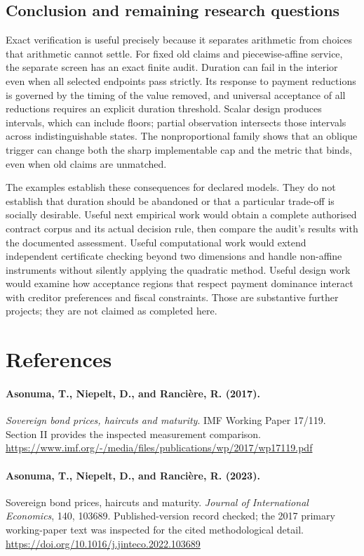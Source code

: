 \documentclass[11pt,a4paper]{article}
\begin{document}
\subsection{Conclusion and remaining research questions}
Exact verification is useful precisely because it separates arithmetic from choices that arithmetic cannot settle. For fixed old claims and piecewise-affine service, the separate screen has an exact finite audit. Duration can fail in the interior even when all selected endpoints pass strictly. Its response to payment reductions is governed by the timing of the value removed, and universal acceptance of all reductions requires an explicit duration threshold. Scalar design produces intervals, which can include floors; partial observation intersects those intervals across indistinguishable states. The nonproportional family shows that an oblique trigger can change both the sharp implementable cap and the metric that binds, even when old claims are unmatched.

The examples establish these consequences for declared models. They do not establish that duration should be abandoned or that a particular trade-off is socially desirable. Useful next empirical work would obtain a complete authorised contract corpus and its actual decision rule, then compare the audit's results with the documented assessment. Useful computational work would extend independent certificate checking beyond two dimensions and handle non-affine instruments without silently applying the quadratic method. Useful design work would examine how acceptance regions that respect payment dominance interact with creditor preferences and fiscal constraints. Those are substantive further projects; they are not claimed as completed here.

\newpage
\section*{References}
\small
\paragraph{Asonuma, T., Niepelt, D., and Ranci\`ere, R. (2017).}
\emph{Sovereign bond prices, haircuts and maturity}. IMF Working Paper 17/119. Section II provides the inspected measurement comparison. \url{https://www.imf.org/-/media/files/publications/wp/2017/wp17119.pdf}
\paragraph{Asonuma, T., Niepelt, D., and Ranci\`ere, R. (2023).}
Sovereign bond prices, haircuts and maturity. \emph{Journal of International Economics}, 140, 103689. Published-version record checked; the 2017 primary working-paper text was inspected for the cited methodological detail. \url{https://doi.org/10.1016/j.jinteco.2022.103689}
\end{document}
